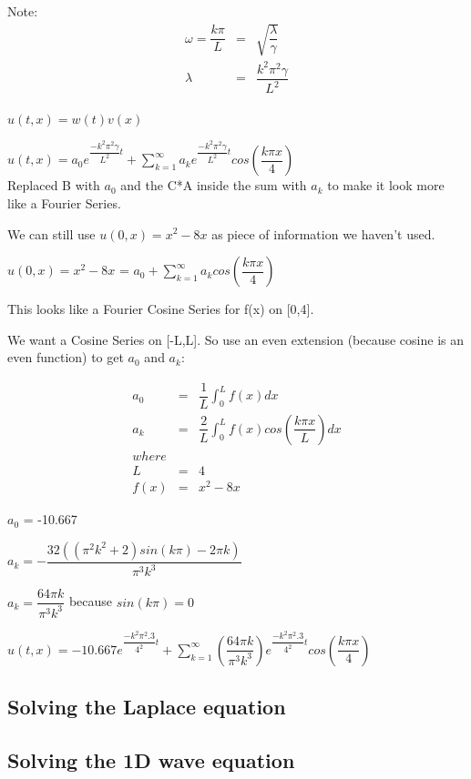 \documentclass{article}
\newcommand{\bea}{\begin{eqnarray*}}
\newcommand{\eea}{\end{eqnarray*}}
\newcommand{\red}[1]{\textcolor{red}{#1}}
\begin{document}
Note: \bea
\omega= \dfrac{k \pi}{L} &=& \sqrt{\dfrac{\lambda}{\gamma}} \\
\lambda &=& \dfrac{k^2 \pi^2 \gamma }{L^2} \\
\eea

$u(t,x) = w(t)v(x)$

$u(t,x) = a_0e^{\dfrac{-k^2 \pi^2 \gamma }{L^2}t} + \sum_{k=1}^{\infty} a_k e^{\dfrac{-k^2 \pi^2 \gamma }{L^2}t} cos(\dfrac{k \pi x}{4})$ \\ 

Replaced B with $a_0$ and the C*A inside the sum with $a_k$ to make it look more like a Fourier Series. 

We can still use $u(0,x)=x^2-8x$ as piece of information we haven't used.

$u(0,x)=x^2-8x$ = $a_0 + \sum_{k=1}^{\infty} a_k cos(\dfrac{k \pi x}{4})$ 

This looks like a Fourier Cosine Series for f(x) on [0,4].

We want a Cosine Series on [-L,L]. So use an even extension (because cosine is an even function) to get $a_0$ and $a_k$:

\bea
a_0 &=& \dfrac{1}{L}\int_{0}^{L} f(x)dx \\
a_k &=& \dfrac{2}{L}\int_{0}^{L} f(x)cos(\dfrac{k \pi x}{L})dx \\
where \\
L&=&4\\
f(x) &=& x^2-8x
\eea

$a_0$ = -10.667

$a_k = -\dfrac{32((\pi^2 k^2 +2)sin(k \pi) - 2 \pi k)}{\pi^3 k ^3}$

$a_k = \dfrac{64 \pi k}{\pi^3 k ^3}$ because $sin(k\pi) = 0$ \newline


$u(t,x) = -10.667e^{\dfrac{-k^2 \pi^2 .3 }{4^2}t} + \sum_{k=1}^{\infty} (\dfrac{64 \pi k}{\pi^3 k ^3}) e^{\dfrac{-k^2 \pi^2 .3 }{4^2}t} cos(\dfrac{k \pi x}{4})$ \\ 


\subsection{Solving the Laplace equation}
 


\subsection{Solving the 1D wave equation}
\end{document}
